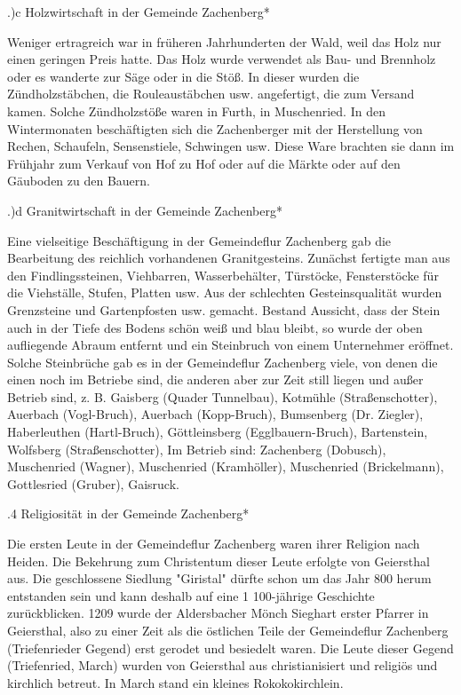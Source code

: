 .)c Holzwirtschaft in der Gemeinde Zachenberg*

Weniger ertragreich war in früheren Jahrhunderten der Wald, weil das Holz nur
einen geringen Preis hatte. Das Holz wurde verwendet als Bau- und Brennholz oder
es wanderte zur Säge oder in die Stöß. In dieser wurden die Zündholzstäbchen,
die Rouleaustäbchen usw. angefertigt, die zum Versand kamen. Solche
Zündholzstöße waren in Furth, in Muschenried. In den Wintermonaten beschäftigten
sich die Zachenberger mit der Herstellung von Rechen, Schaufeln, Sensenstiele,
Schwingen usw. Diese Ware brachten sie dann im Frühjahr zum Verkauf von Hof zu
Hof oder auf die Märkte oder auf den Gäuboden zu den Bauern.

.)d Granitwirtschaft in der Gemeinde Zachenberg*

Eine vielseitige Beschäftigung in der Gemeindeflur Zachenberg gab die
Bearbeitung des reichlich vorhandenen Granitgesteins. Zunächst fertigte man aus
den Findlingssteinen, Viehbarren, Wasserbehälter, Türstöcke, Fensterstöcke für
die Viehställe, Stufen, Platten usw. Aus der schlechten Gesteinsqualität wurden
Grenzsteine und Gartenpfosten usw. gemacht. Bestand Aussicht, dass der Stein
auch in der Tiefe des Bodens schön weiß und blau bleibt, so wurde der oben
aufliegende Abraum entfernt und ein Steinbruch von einem Unternehmer eröffnet.
Solche Steinbrüche gab es in der Gemeindeflur Zachenberg viele, von denen die
einen noch im Betriebe sind, die anderen aber zur Zeit still liegen und außer
Betrieb sind, z. B. Gaisberg (Quader Tunnelbau)‚ Kotmühle (Straßenschotter)‚
Auerbach (Vogl-Bruch), Auerbach (Kopp-Bruch), Bumsenberg (Dr. Ziegler),
Haberleuthen (Hartl-Bruch), Göttleinsberg (Egglbauern-Bruch), Bartenstein,
Wolfsberg (Straßenschotter), Im Betrieb sind: Zachenberg (Dobusch), Muschenried
(Wagner), Muschenried (Kramhöller), Muschenried (Brickelmann), Gottlesried
(Gruber), Gaisruck.

.4 Religiosität in der Gemeinde Zachenberg*

Die ersten Leute in der Gemeindeflur Zachenberg waren ihrer Religion nach
Heiden. Die Bekehrung zum Christentum dieser Leute erfolgte von Geiersthal aus.
Die geschlossene Siedlung "Giristal" dürfte schon um das Jahr 800 herum
entstanden sein und kann deshalb auf eine 1 100-jährige Geschichte
zurückblicken. 1209 wurde der Aldersbacher Mönch Sieghart erster Pfarrer in
Geiersthal, also zu einer Zeit als die östlichen Teile der Gemeindeflur
Zachenberg (Triefenrieder Gegend) erst gerodet und besiedelt waren. Die Leute
dieser Gegend (Triefenried, March) wurden von Geiersthal aus christianisiert und
religiös und kirchlich betreut. In March stand ein kleines Rokokokirchlein.

